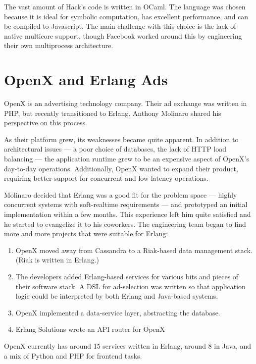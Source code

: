 \documentclass{jfp1}
\begin{document}
The vast amount of Hack's code is written in OCaml. The language was
chosen because it is ideal for symbolic computation, has excellent
performance, and can be compiled to Javascript.  The main
challenge with this choice is the lack of native multicore support, though
Facebook worked around this by engineering their own multiprocess
architecture.

\section{OpenX and Erlang Ads}


OpenX is an advertising technology company. Their ad exchange was
written in PHP, but recently transitioned to Erlang. Anthony Molinaro
shared his perspective on this process.

As their platform grew, its weaknesses became quite apparent. In
addition to architectural issues --- a poor choice of databases, the
lack of HTTP load balancing --- the application runtime grew to be an
expensive aspect of OpenX's day-to-day operations. Additionally, OpenX
wanted to expand their product, requiring better support for
concurrent and low latency operations.

Molinaro decided that Erlang was a good fit for the problem space ---
highly concurrent systems with soft-realtime requirements --- and
prototyped an initial implementation within a few months. This experience
left him quite satisfied and he started to evangelize it to his coworkers.
The engineering team began to find more and more projects that
were suitable for Erlang:

\begin{enumerate}

\item OpenX moved away from Cassandra to a Riak-based data management
stack. (Riak is written in Erlang.)

\item The developers added Erlang-based services for various bits and pieces of their
software stack. A DSL for ad-selection was written so that application
logic could be interpreted by both Erlang and Java-based systems.

\item OpenX implemented a data-service layer, abstracting the database.

\item Erlang Solutions wrote an API router for OpenX
\end{enumerate}
%
OpenX currently has around 15 services written in Erlang, around 8 in
Java, and a mix of Python and PHP for frontend tasks.
\end{document}
